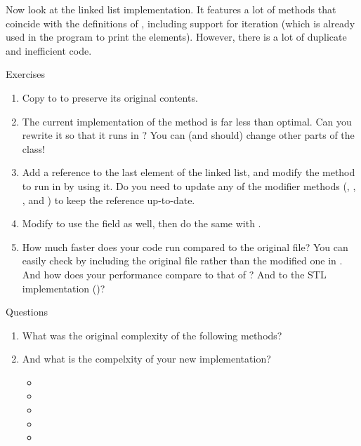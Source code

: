 \documentclass[12pt]{article}
\begin{document}
Now look at the linked list implementation. It features a lot of methods that coincide with the definitions of , including support for iteration (which is already used in the program to print the elements). However, there is a lot of duplicate and inefficient code.
%
\begin{mybox}{Exercises}
    \begin{enumerate}
        \item Copy  to  to preserve its original contents.
        \item The current implementation of the  method is far less than optimal. Can you rewrite it so that it runs in ? You can (and should) change other parts of the class!
        \item Add a reference to the last element of the linked list, and modify the  method to run in  by using it. Do you need to update any of the modifier methods (, , , and ) to keep the reference up-to-date.
        \item Modify  to use the field as well, then do the same with .
        \item How much faster does your code run compared to the original file? You can easily check by including the original file rather than the modified one in . And how does your performance compare to that of ? And to the STL implementation ()?
    \end{enumerate}
\end{mybox}
%
\begin{mybox}{Questions}
    \begin{enumerate}
        \item What was the original complexity of the following methods?
        \item And what is the compelxity of your new implementation?
        \begin{itemize}
            \item {}
            \item {}
            \item {}
            \item {}
            \item {}
        \end{itemize}
    \end{enumerate}
\end{mybox}
\end{document}
